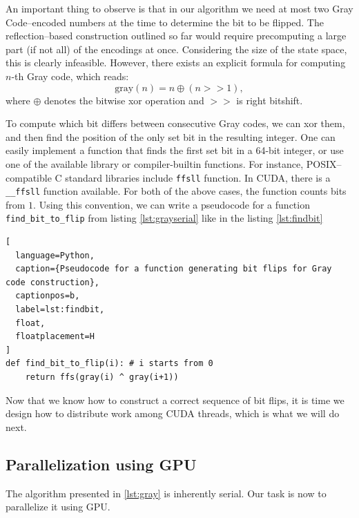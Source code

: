 An important thing to observe is that in our algorithm we need at most two Gray
Code--encoded numbers at the time to determine the bit to be flipped. The
reflection--based construction outlined so far would require precomputing a
large part (if not all) of the encodings at once. Considering the size of the
state space, this is clearly infeasible. However, there exists an explicit formula
for computing $n$-th Gray code, which reads:
\begin{equation}
\mbox{gray}(n) = n \oplus (n >> 1),
\end{equation}
where $\oplus$ denotes the bitwise xor operation and $>>$ is right bitshift.

To compute which bit differs between consecutive Gray codes, we can xor them,
and then find the position of the only set bit in the resulting integer. One can
easily implement a function that finds the first set bit in a 64-bit integer,
or use one of the available library or compiler-builtin functions. For instance,
POSIX--compatible C standard libraries include \texttt{ffsll} function. In CUDA,
there is a \texttt{\_\_ffsll} function available. For both of the above cases,
the function counts bits from $1$. Using this convention, we can write a pseudocode
for a function \texttt{find\_bit\_to\_flip} from listing \ref{lst:grayserial} like in the
listing \ref{lst:findbit}

\begin{lstlisting}[
  language=Python,
  caption={Pseudocode for a function generating bit flips for Gray code construction},
  captionpos=b,
  label=lst:findbit,
  float,
  floatplacement=H
]
def find_bit_to_flip(i): # i starts from 0
    return ffs(gray(i) ^ gray(i+1))
\end{lstlisting}

Now that we know how to construct a correct sequence of bit flips, it is time we design
how to distribute work among CUDA threads, which is what we will do next.

\subsection{Parallelization using GPU}
The algorithm presented in \ref{lst:gray} is inherently serial. Our task is now to
parallelize it using GPU.

